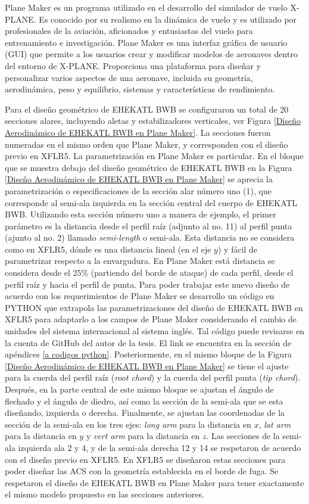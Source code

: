 Plane Maker es un programa utilizado en el desarrollo del simulador de vuelo X-PLANE. Es conocido por su realismo en la dinámica de vuelo y es utilizado por profesionales de la aviación, aficionados y entusiastas del vuelo para entrenamiento e investigación.
Plane Maker es una interfaz gráfica de usuario (GUI) que permite a los usuarios crear y modificar modelos de aeronaves dentro del entorno de X-PLANE. Proporciona una plataforma para diseñar y personalizar varios aspectos de una aeronave, incluida su geometría, aerodinámica, peso y equilibrio, sistemas y características de rendimiento.

Para el diseño geométrico de EHEKATL BWB se configuraron un total de 20 secciones alares, incluyendo aletas y estabilizadores verticales, ver Figura \ref{Diseño Aerodinámico de EHEKATL BWB en Plane Maker}. La secciones fueron numeradas en el mismo orden que Plane Maker, y corresponden con el diseño previo en XFLR5. 
La parametrización en Plane Maker es particular. En el bloque que se muestra debajo del diseño geométrico de EHEKATL BWB en la Figura \ref{Diseño Aerodinámico de EHEKATL BWB en Plane Maker} se aprecia la parametrización o especificaciones de la sección alar número uno (1), que corresponde al semi-ala izquierda en la sección central del cuerpo de EHEKATL BWB. Utilizando esta sección número uno a manera de ejemplo, el primer parámetro es la distancia desde el perfil raíz (adjunto al no. 11) al perfil punta (ajunto al no. 2) llamado \textit{semi-length} o semi-ala. Esta distancia no se considera como en XFLR5, dónde es una distancia lineal (en el eje $y$) y fácil de parametrizar respecto a la envargudura. En Plane Maker está distancia se considera desde el 25$\%$ (partiendo del borde de ataque) de cada perfil, desde el perfil raíz y hacia el perfil de punta. Para poder trabajar este nuevo diseño de acuerdo con los requerimientos de Plane Maker se desarrollo un código en PYTHON que extrapola las parametrizaciones del diseño de EHEKATL BWB en XFLR5 para adaptarlo a los campos de Plane Maker considerando el cambio de unidades del sistema internacional al sistema inglés. Tal código puede revisarse en la cuenta de GitHub del autor de la tesis. El link se encuentra en la sección de apéndices \ref{a codigos python}. 
Posteriormente, en el mismo bloque de la Figura \ref{Diseño Aerodinámico de EHEKATL BWB en Plane Maker} se tiene el ajuste para la cuerda del perfil raíz (\textit{root chord}) y la cuerda del perfil punta (\textit{tip chord}). 
Después, en la parte central de este mismo bloque se ajustan el ángulo de flechado y el ángulo de diedro, así como la sección de la semi-ala que se esta diseñando, izquierda o derecha. Finalmente, se ajustan las coordenadas de la sección de la semi-ala en los tres ejes: \textit{long arm} para la distancia en $x$, \textit{lat arm} para la distancia en $y$ y \textit{vert arm} para la distancia en $z$.  
Las secciones de la semi-ala izquierda ala 2 y 4, y de la semi-ala derecha 12 y 14 se respetaron de acuerdo con el diseño previo en XFLR5. En XFLR5 se diseñaron estas secciones para poder diseñar las ACS con la geometría establecida en el borde de fuga. Se respetaron el diseño de EHEKATL BWB en Plane Maker para tener exactamente el mismo modelo propuesto en las secciones anteriores. 

